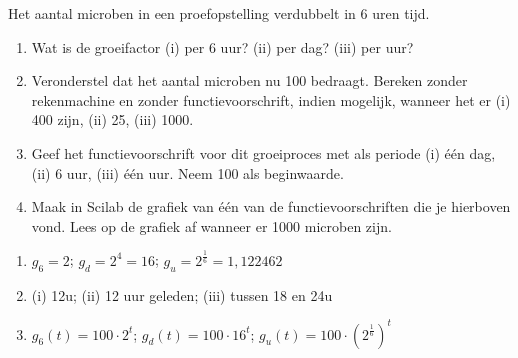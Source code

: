 \begin{oef}
Het aantal microben in een proefopstelling verdubbelt in 6 uren tijd.
\begin{enumerate}
  \item Wat is de groeifactor (i) per 6 uur? (ii) per dag? (iii) per uur?
  \item Veronderstel dat het aantal microben nu 100 bedraagt. Bereken zonder rekenmachine en zonder functievoorschrift, indien mogelijk, wanneer het er (i) 400 zijn, (ii) 25,  (iii) 1000.
  \item Geef het functievoorschrift voor dit groeiproces met als periode
        (i) \'e\'en dag, (ii)  6 uur, (iii) \'{e}\'{e}n uur. Neem 100 als beginwaarde.
  \item Maak in Scilab de grafiek van \'e\'en van de functievoorschriften die je hierboven vond. Lees op de grafiek af wanneer er 1000 microben zijn.
\end{enumerate}
\begin{opl}
\begin{enumerate}
  \item $g_6=2$; $g_d=2^4=16$; $g_u=2^\frac{1}{6}=1,122462$
  \item (i) 12u; (ii) 12 uur geleden; (iii) tussen 18 en 24u
  \item $g_6(t)=100\cdot 2^t$; $g_d(t)=100\cdot 16^t$; $g_u(t)=100\cdot \left(2^\frac16 \right)^t$
\end{enumerate}
\end{opl}
\end{oef}


